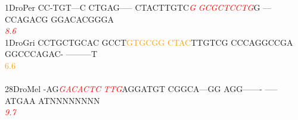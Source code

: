 \documentclass[11pt,twoside,reqno,a4paper]{article}
\begin{document}
{1\hspace*{3\charwidth}DroPer	CC-TGT---C	CTGAG-----	CTACTTGTC\textit{\textcolor{red}{G}}	\textit{\textcolor{red}{G}}\textit{\textcolor{red}{C}}\textit{\textcolor{red}{G}}\textit{\textcolor{red}{C}}\textit{\textcolor{red}{T}}\textit{\textcolor{red}{C}}\textit{\textcolor{red}{C}}\textit{\textcolor{red}{T}}\textit{\textcolor{red}{G}}G	---CCAGACG	GGACACGGGA	\\
\hspace*{4\charwidth}\hspace*{7\charwidth}\hspace*{1\charwidth}\hspace*{1\charwidth}\hspace*{29\charwidth}\textit{\textcolor{red}{8.6}}\hspace*{1\charwidth}\hspace*{1\charwidth}\hspace*{1\charwidth}\hspace*{1\charwidth}\\
1\hspace*{3\charwidth}DroGri	CCTGCTGCAC	GCCT\textcolor{orange}{G}\textcolor{orange}{T}\textcolor{orange}{G}\textcolor{orange}{C}\textcolor{orange}{G}\textcolor{orange}{G}	\textcolor{orange}{C}\textcolor{orange}{T}\textcolor{orange}{A}\textcolor{orange}{C}TTGTCG	CCCAGGCCGA	GGCCCAGAC-	---------T	\\
\hspace*{4\charwidth}\hspace*{7\charwidth}\hspace*{1\charwidth}\hspace*{14\charwidth}\textcolor{orange}{6.6}\hspace*{1\charwidth}\hspace*{1\charwidth}\hspace*{1\charwidth}\hspace*{1\charwidth}\hspace*{1\charwidth}\\
\\
28\hspace*{2\charwidth}DroMel	-AG\textit{\textcolor{red}{G}}\textit{\textcolor{red}{A}}\textit{\textcolor{red}{C}}\textit{\textcolor{red}{A}}\textit{\textcolor{red}{C}}\textit{\textcolor{red}{T}}\textit{\textcolor{red}{C}}	\textit{\textcolor{red}{T}}\textit{\textcolor{red}{T}}\textit{\textcolor{red}{G}}AGGATGT	CGGCA---GG	AGG-------	-----ATGAA	ATNNNNNNNN	\\
\hspace*{4\charwidth}\hspace*{7\charwidth}\hspace*{3\charwidth}\textit{\textcolor{red}{9.7}}\hspace*{1\charwidth}\hspace*{1\charwidth}\hspace*{1\charwidth}\hspace*{1\charwidth}\hspace*{1\charwidth}\hspace*{1\charwidth}\\
}
\end{document}
